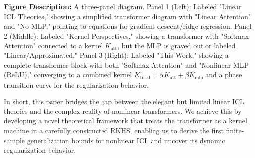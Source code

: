\textbf{Figure Description:} A three-panel diagram. Panel 1 (Left): Labeled "Linear ICL Theories," showing a simplified transformer diagram with "Linear Attention" and "No MLP," pointing to equations for gradient descent/ridge regression. Panel 2 (Middle): Labeled "Kernel Perspectives," showing a transformer with "Softmax Attention" connected to a kernel $K_{\text{att}}$, but the MLP is grayed out or labeled "Linear/Approximated." Panel 3 (Right): Labeled "This Work," showing a complete transformer block with both "Softmax Attention" and "Nonlinear MLP (ReLU)," converging to a combined kernel $K_{\text{total}} = \alpha K_{\text{att}} + \beta K_{\text{mlp}}$ and a phase transition curve for the regularization behavior.

In short, this paper bridges the gap between the elegant but limited linear ICL theories and the complex reality of nonlinear transformers. We achieve this by developing a novel theoretical framework that treats the transformer as a kernel machine in a carefully constructed RKHS, enabling us to derive the first finite-sample generalization bounds for nonlinear ICL and uncover its dynamic regularization behavior.
